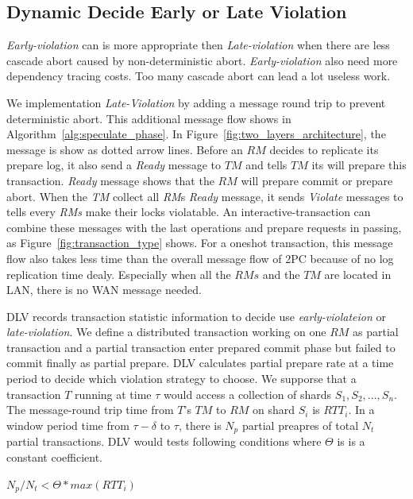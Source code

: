 \documentclass[conference]{IEEEtran}
\begin{document}
\subsection {Dynamic Decide Early or Late Violation}
\emph{Early-violation} can is more appropriate then \emph{Late-violation} when there are less cascade abort caused by non-deterministic abort.
\emph{Early-violation} also need more dependency tracing costs.
Too many cascade abort can lead a lot useless work.

We implementation \emph{Late-Violation} by adding a message round trip to prevent deterministic abort.
This additional message flow shows in Algorithm~\ref{alg:speculate_phase}.
In Figure~\ref{fig:two_layers_architecture}, the message is show as dotted arrow lines.
Before an ${RM}$ decides to replicate its prepare log, it also send a \emph{Ready} message to ${TM}$ and tells ${TM}$ its will prepare this transaction.
\emph{Ready} message shows that the ${RM}$ will prepare commit or prepare abort.
When the \emph{TM} collect all \emph{RM}s \emph{Ready} message, it sends \emph{Violate} messages to tells every \emph{RMs} make their locks violatable.
An interactive-transaction can combine these messages with the last operations and prepare requests in passing, as Figure~\ref{fig:transaction_type} shows.
For a oneshot transaction, this message flow also takes less time than the overall message flow of 2PC because of no log replication time dealy.
Especially when all the ${RMs}$ and the ${TM}$ are located in LAN, there is no WAN message needed. 

DLV records transaction statistic information to decide use \emph{early-violateion} or \emph{late-violation}.
We define a distributed transaction working on one ${RM}$ as partial transaction and a partial transaction enter prepared commit phase but failed to commit finally as partial prepare.
DLV calculates partial prepare rate at a time period to decide which violation strategy to choose.
We supporse that a transaction ${T}$ running at time ${\tau}$ would access a collection of shards
${S_1, S_2, ..., S_n}$. 
The message-round trip time from ${T}$'s ${TM}$ to ${RM}$ on shard ${S_i}$ is ${RTT_i}$.
In a window period time from ${\tau - \delta}$ to ${\tau}$, there is ${N_p}$ partial preapres of total ${N_t}$ partial transactions. 
DLV would tests following conditions where ${\Theta}$ is is a constant coefficient. 

\begin{center}
  ${N_p / N_t < \Theta * max(RTT_i)}$
\end{center}
\end{document}
